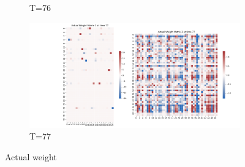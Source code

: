 \documentclass{article}
\begin{document}
\begin{figure}[h!]
\begin{minipage}[b]{0.45\linewidth}
\begin{subfigure}[b]{\linewidth}
      \caption{T=76}
    \end{subfigure}
    \vfill
    \begin{subfigure}[b]{\linewidth}
      \includegraphics[width=\textwidth]{Actual_Weight_combined_77}
      \caption{T=77}
    \end{subfigure}
  \end{minipage}
  \caption{Actual weight}
\end{figure}
\end{document}
